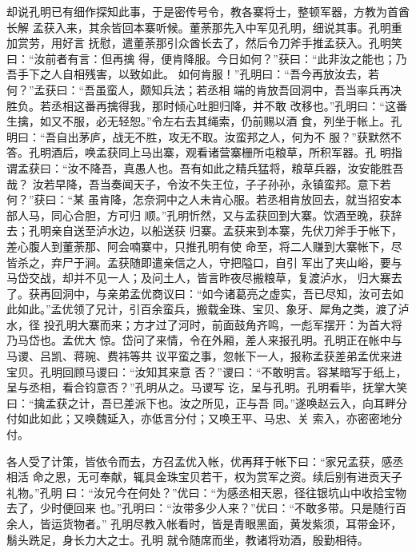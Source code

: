 却说孔明已有细作探知此事，于是密传号令，教各寨将士，整顿军器，方教为首酋长解
孟获入来，其余皆回本寨听候。董荼那先入中军见孔明，细说其事。孔明重加赏劳，用好言
抚慰，遣董荼那引众酋长去了，然后令刀斧手推孟获入。孔明笑曰：“汝前者有言：但再擒
得，便肯降服。今日如何？”获曰：“此非汝之能也；乃吾手下之人自相残害，以致如此。
如何肯服！”孔明曰：“吾今再放汝去，若何？”孟获曰：“吾虽蛮人，颇知兵法；若丞相
端的肯放吾回洞中，吾当率兵再决胜负。若丞相这番再擒得我，那时倾心吐胆归降，并不敢
改移也。”孔明曰：“这番生擒，如又不服，必无轻恕。”令左右去其绳索，仍前赐以酒
食，列坐于帐上。孔明曰：“吾自出茅庐，战无不胜，攻无不取。汝蛮邦之人，何为不
服？”获默然不答。孔明酒后，唤孟获同上马出寨，观看诸营寨栅所屯粮草，所积军器。孔
明指谓孟获曰：“汝不降吾，真愚人也。吾有如此之精兵猛将，粮草兵器，汝安能胜吾哉？
汝若早降，吾当奏闻天子，令汝不失王位，子子孙孙，永镇蛮邦。意下若何？”获曰：“某
虽肯降，怎奈洞中之人未肯心服。若丞相肯放回去，就当招安本部人马，同心合胆，方可归
顺。”孔明忻然，又与孟获回到大寨。饮酒至晚，获辞去；孔明亲自送至泸水边，以船送获
归寨。孟获来到本寨，先伏刀斧手于帐下，差心腹人到董荼那、阿会喃寨中，只推孔明有使
命至，将二人赚到大寨帐下，尽皆杀之，弃尸于涧。孟获随即遣亲信之人，守把隘口，自引
军出了夹山峪，要与马岱交战，却并不见一人；及问土人，皆言昨夜尽搬粮草，复渡泸水，
归大寨去了。获再回洞中，与亲弟孟优商议曰：“如今诸葛亮之虚实，吾已尽知，汝可去如
此如此。”孟优领了兄计，引百余蛮兵，搬载金珠、宝贝、象牙、犀角之类，渡了泸水，径
投孔明大寨而来；方才过了河时，前面鼓角齐鸣，一彪军摆开：为首大将乃马岱也。孟优大
惊。岱问了来情，令在外厢，差人来报孔明。孔明正在帐中与马谡、吕凯、蒋琬、费祎等共
议平蛮之事，忽帐下一人，报称孟获差弟孟优来进宝贝。孔明回顾马谡曰：“汝知其来意
否？”谡曰：“不敢明言。容某暗写于纸上，呈与丞相，看合钧意否？”孔明从之。马谡写
讫，呈与孔明。孔明看毕，抚掌大笑曰：“擒孟获之计，吾已差派下也。汝之所见，正与吾
同。”遂唤赵云入，向耳畔分付如此如此；又唤魏延入，亦低言分付；又唤王平、马忠、关
索入，亦密密地分付。

各人受了计策，皆依令而去，方召孟优入帐，优再拜于帐下曰：“家兄孟获，感丞相活
命之恩，无可奉献，辄具金珠宝贝若干，权为赏军之资。续后别有进贡天子礼物。”孔明
曰：“汝兄今在何处？”优曰：“为感丞相天恩，径往银坑山中收拾宝物去了，少时便回来
也。”孔明曰：“汝带多少人来？”优曰：“不敢多带。只是随行百余人，皆运货物者。”
孔明尽教入帐看时，皆是青眼黑面，黄发紫须，耳带金环，鬅头跣足，身长力大之士。孔明
就令随席而坐，教诸将劝酒，殷勤相待。

